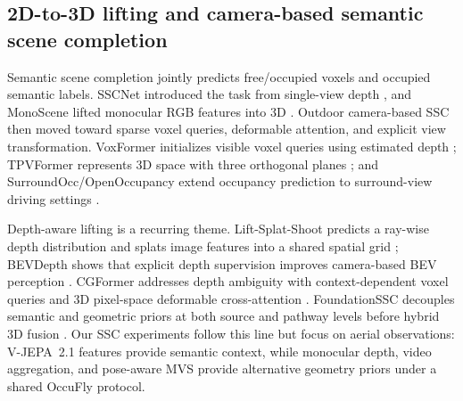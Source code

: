 \subsection{2D-to-3D lifting and camera-based semantic scene completion}
Semantic scene completion jointly predicts free/occupied voxels and occupied semantic labels. SSCNet introduced the task from single-view depth \cite{song2017sscnet}, and MonoScene lifted monocular RGB features into 3D \cite{cao2022monoscene}. Outdoor camera-based SSC then moved toward sparse voxel queries, deformable attention, and explicit view transformation. VoxFormer initializes visible voxel queries using estimated depth \cite{li2023voxformer}; TPVFormer represents 3D space with three orthogonal planes \cite{huang2023tpvformer}; and SurroundOcc/OpenOccupancy extend occupancy prediction to surround-view driving settings \cite{wei2023surroundocc,wang2023openoccupancy}.

Depth-aware lifting is a recurring theme. Lift-Splat-Shoot predicts a ray-wise depth distribution and splats image features into a shared spatial grid \cite{philion2020lift}; BEVDepth shows that explicit depth supervision improves camera-based BEV perception \cite{li2023bevdepth}. CGFormer addresses depth ambiguity with context-dependent voxel queries and 3D pixel-space deformable cross-attention \cite{yu2024cgformer}. FoundationSSC decouples semantic and geometric priors at both source and pathway levels before hybrid 3D fusion \cite{chen2025foundationssc}. Our SSC experiments follow this line but focus on aerial observations: V-JEPA~2.1 features provide semantic context, while monocular depth, video aggregation, and pose-aware MVS provide alternative geometry priors under a shared OccuFly protocol.

